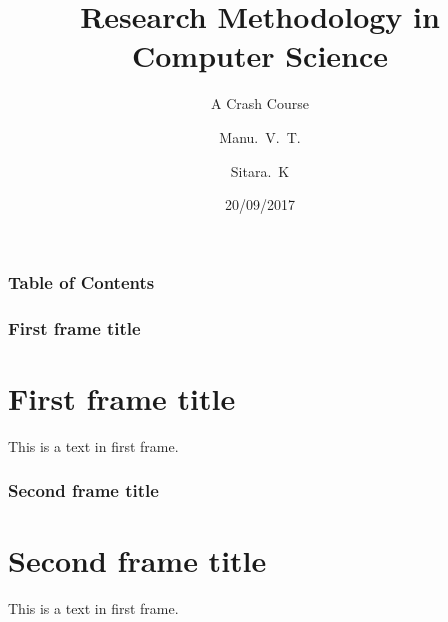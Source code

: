 \documentclass{beamer}
\title{Research Methodology in Computer Science}
\subtitle{A Crash Course}
\author{Manu.~V.~T.\inst{1} \and Sitara.~K\inst{2}}
\institute[VFU] %
{
	\inst{1}%
	IDRBT\\
	Hyderabad
	\and
	\inst{2}%
	SCIS\\
	University of Hyderabad
}
\date{20/09/2017}
\begin{document}
	\frame{\titlepage}
	\begin{frame}
	\frametitle{Table of Contents}
	\tableofcontents
	\end{frame}
	\begin{frame}
	\frametitle{First frame title}
	\section{First frame title}
	This is a text in first frame. 
	\end{frame}
	\begin{frame}
	\frametitle{Second frame title}
	\section{Second frame title}
	This is a text in first frame. 
\end{frame}
\end{document}
